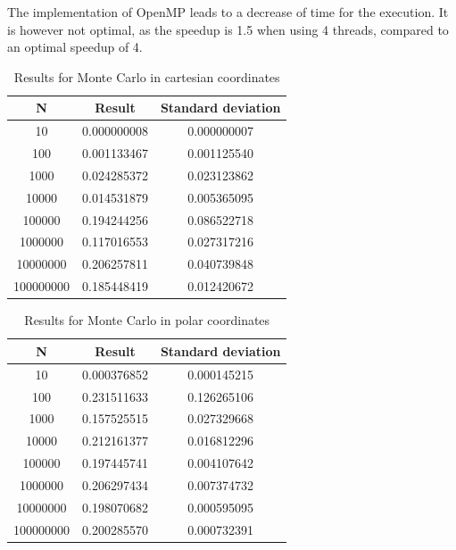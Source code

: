 \documentclass[11pt,a4paper,english,final]{article}
\numberwithin{equation}{section}
\begin{document}
The implementation of OpenMP leads to a decrease of time for the execution.
It is however not optimal, as the speedup is 1.5 when using 4 threads,
compared to an optimal speedup of 4.



\begin{table}
\centering
\caption{Results for Monte Carlo in cartesian coordinates} \vspace{2mm}
\begin{tabular}{|c|c|c|} \hline
N & Result & Standard deviation\\ \hline
10 & 0.000000008 & 0.000000007\\
100 & 0.001133467 & 0.001125540\\
1000 & 0.024285372 & 0.023123862\\
10000 & 0.014531879 & 0.005365095\\
100000 & 0.194244256 & 0.086522718\\
1000000 & 0.117016553 & 0.027317216\\
10000000 & 0.206257811 & 0.040739848\\
100000000 & 0.185448419 & 0.012420672\\ \hline
\end{tabular}
\label{table:MCC}
\end{table}

\begin{table}
\centering
\caption{Results for Monte Carlo in polar coordinates} \vspace{2mm}
\begin{tabular}{|c|c|c|} \hline
N & Result & Standard deviation\\ \hline
10 & 0.000376852 & 0.000145215\\
100 & 0.231511633 & 0.126265106\\
1000 & 0.157525515 & 0.027329668\\
10000 & 0.212161377 & 0.016812296\\
100000 & 0.197445741 & 0.004107642\\
1000000 & 0.206297434 & 0.007374732\\
10000000 & 0.198070682 & 0.000595095\\
100000000 & 0.200285570 & 0.000732391\\ \hline
\end{tabular}
\label{table:MCP}
\end{table}
\end{document}
